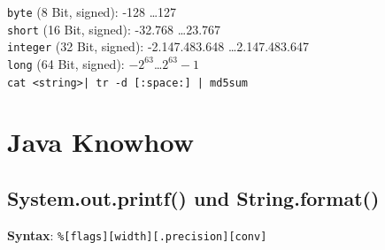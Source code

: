 \documentclass[10pt,a4paper,ngerman,oneside,]{article}
\begin{document}
\vspace{-2mm}
\begin{multicols}{2}
{}

\vspace{1em}
\noindent
\texttt{byte} (8 Bit, signed): -128 \dots 127\\
\texttt{short} (16 Bit, signed): -32.768 \dots 23.767\\
\texttt{integer} (32 Bit, signed): -2.147.483.648 \dots 2.147.483.647\\
\texttt{long} (64 Bit, signed): $-2^{63}$\dots $2^{63}-1$\\

\newcommand{\hash}[1]{{\bfseries MD5:} ~\texttt{#1}}
\vspace{1.2em} \texttt{\small cat <string>| tr -d [:space:] | md5sum}\\

\newpage
\newpage
\end{multicols}

\section{Java Knowhow}
\subsection{System.out.printf() und String.format()}
\textbf{Syntax}: \texttt{\%[flags][width][.precision][conv]}
\end{document}
